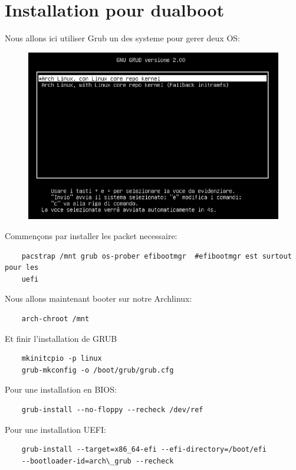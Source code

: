 \documentclass[a4paper]{book}
\begin{document}
  \section{Installation pour dualboot}
  Nous allons ici utiliser Grub un des systeme pour gerer deux OS\@:\\
  \begin{figure}[h]
    \includegraphics[width=\textwidth]{images/grub}
  \end{figure}
  Commençons par installer les packet necessaire\@:\\
  \begin{lstlisting}
    pacstrap /mnt grub os-prober efibootmgr  #efibootmgr est surtout pour les 
    uefi
  \end{lstlisting}
  Nous allons maintenant booter sur notre Archlinux\@:\\
  \begin{lstlisting}
    arch-chroot /mnt
  \end{lstlisting}
  Et finir l'installation de GRUB\\
  \begin{lstlisting}
    mkinitcpio -p linux
    grub-mkconfig -o /boot/grub/grub.cfg
  \end{lstlisting}
  Pour une installation en BIOS\@:\\
  \begin{lstlisting}
    grub-install --no-floppy --recheck /dev/ref
  \end{lstlisting}
  Pour une installation UEFI\@:\\
  \begin{lstlisting}
    grub-install --target=x86_64-efi --efi-directory=/boot/efi
    --bootloader-id=arch\_grub --recheck
  \end{lstlisting}
\end{document}
